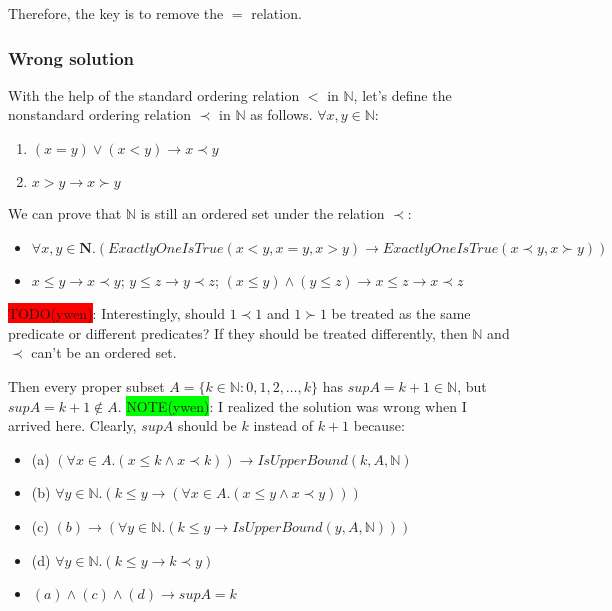 \documentclass[12pt, letterpaper, oneside]{book}
\begin{document}
Therefore, the key is to remove the $=$ relation.

\subsubsection{Wrong solution}

With the help of the standard ordering relation $<$ in $\mathbb{N}$, let's define the nonstandard ordering relation
$\prec$ in $\mathbb{N}$ as follows. $\forall x, y \in \mathbb{N}$:
\begin{enumerate}
  \item $(x = y) \lor (x < y) \rightarrow x \prec y$
  \item $x > y \rightarrow x \succ y$
\end{enumerate}

We can prove that $\mathbb{N}$ is still an ordered set under the relation $\prec$:
\begin{itemize}
  \item $\forall x, y \in \mathbf{N}. (ExactlyOneIsTrue(x < y, x = y, x > y) \rightarrow ExactlyOneIsTrue(x \prec y, x \succ y))$
  \item $x \le y \rightarrow x \prec y$; $y \le z \rightarrow y \prec z$; $(x \le y) \land (y \le z) \rightarrow x \le z \rightarrow x \prec z$
\end{itemize}

\colorbox{red}{TODO(ywen)}: Interestingly, should $1 \prec 1$ and $1 \succ 1$ be treated as the same predicate or
different predicates? If they should be treated differently, then $\mathbb{N}$ and $\prec$ can't be an ordered set.

Then every proper subset $A = \{ k \in \mathbb{N}: 0, 1, 2, \ldots, k \}$ has $sup A = k + 1 \in \mathbb{N}$, but
$sup A = k+1 \notin A$. \colorbox{lime}{NOTE(ywen)}: I realized the solution was wrong when I arrived here. Clearly,
$sup A$ should be $k$ instead of $k+1$ because:
\begin{itemize}
  \item (a) $(\forall x \in A. (x \le k \land x \prec k)) \rightarrow IsUpperBound(k, A, \mathbb{N})$
  \item (b) $\forall y \in \mathbb{N}. (k \le y \rightarrow (\forall x \in A. (x \le y \land x \prec y)))$
  \item (c) $(b) \rightarrow (\forall y \in \mathbb{N}. (k \le y \rightarrow IsUpperBound(y, A, \mathbb{N})))$
  \item (d) $\forall y \in \mathbb{N}. (k \le y \rightarrow k \prec y)$
  \item $(a) \land (c) \land (d) \rightarrow sup A = k$
\end{itemize}
\end{document}
